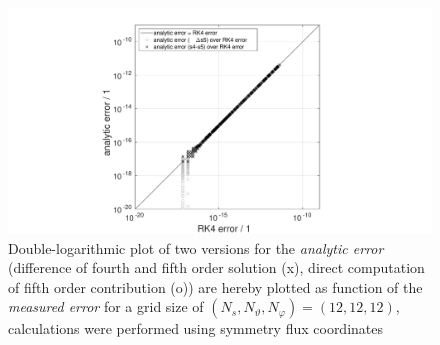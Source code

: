 \documentclass[./main.tex]{subfiles}
\begin{document}
\begin{figure}[H]
\centering
\vspace{-0.5cm}
	\includegraphics[width=1.2\textwidth]{figures/RK4_alpha121212_SFC.pdf}
		\caption{Double-logarithmic plot of two versions for the \textit{analytic error} (difference of fourth and fifth order solution (x), direct computation of fifth order contribution (o)) are hereby plotted as function of the \textit{measured error} for a grid size of $(N_s,N_\vartheta,N_\varphi) = (12,12,12)$, calculations were performed using symmetry flux coordinates}  
	\label{fig:RK4_alpha121212_SFC}

\end{figure}


\newpage
\end{document}
